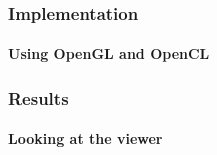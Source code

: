 \documentclass[
    beamer                                       %
  ,table,dvipsnames,svgnames
]{common/mytemplate}
\begin{document}

% 
% 
\begin{frame}
\frametitle{Implementation}
\framesubtitle{Using OpenGL and OpenCL}
\vspace{-15pt}
\begin{figure}[H]
\begin{narrow}{-0.9cm}{-0.9cm}
\end{narrow}
\end{figure}
\end{frame}


{
%
\begin{frame}
\frametitle{Results}
\framesubtitle{Looking at the viewer}
\vspace{8cm}
\end{frame}
}
\end{document}

